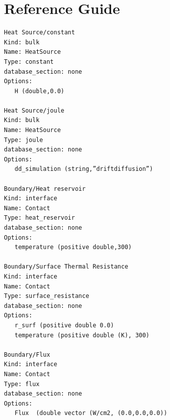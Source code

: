 \documentclass[11pt]{article} %
\begin{document}
\newpage
\section{Reference Guide}


\begin{verbatim}
Heat Source/constant
Kind: bulk 
Name: HeatSource
Type: constant
database_section: none
Options: 
   H (double,0.0)

Heat Source/joule
Kind: bulk 
Name: HeatSource
Type: joule
database_section: none
Options: 
   dd_simulation (string,”driftdiffusion”)

Boundary/Heat reservoir
Kind: interface
Name: Contact
Type: heat_reservoir
database_section: none
Options: 
   temperature (positive double,300)

Boundary/Surface Thermal Resistance
Kind: interface
Name: Contact
Type: surface_resistance
database_section: none
Options: 
   r_surf (positive double 0.0)
   temperature (positive double (K), 300)

Boundary/Flux
Kind: interface
Name: Contact
Type: flux
database_section: none
Options: 
   Flux  (double vector (W/cm2, (0.0,0.0,0.0))


\end{verbatim}
\end{document}
